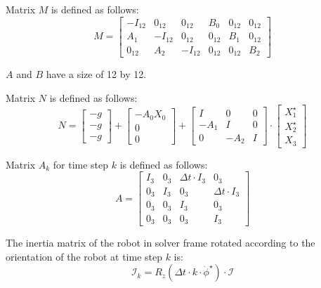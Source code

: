 \documentclass[a4paper,11pt]{article}
\begin{document}
Matrix $M$ is defined as follows:
\begin{equation}
M = \begin{bmatrix} 
-I_{12} & 0_{12} & 0_{12}  & B_0 & 0_{12} & 0_{12}  \\
A_1 & -I_{12} & 0_{12}  & 0_{12} & B_1 & 0_{12} \\
0_{12} & A_2 & -I_{12}  & 0_{12} & 0_{12} & B_2  \end{bmatrix}
\end{equation}

$A$ and $B$ have a size of 12 by 12.

Matrix $N$ is defined as follows:
\begin{equation}
N = \begin{bmatrix} -g \\ -g \\ -g \end{bmatrix} + \begin{bmatrix} -A_0 X_0 \\ 0 \\ 0  \end{bmatrix} + \begin{bmatrix} I & 0 & 0 \\ -A_1 & I & 0 \\ 0 & -A_2 & I \end{bmatrix} \cdot \begin{bmatrix} X_1^\star \\ X_2^\star \\ X_3 \end{bmatrix} 
\end{equation}

Matrix $A_k$ for time step $k$ is defined as follows:
\begin{equation}
A = \begin{bmatrix} 
I_3 & 0_3 & \Delta t \cdot I_3 & 0_3 \\
0_3 & I_3 & 0_3 & \Delta t \cdot I_3 \\
0_3 & 0_3 & I_3 & 0_3 \\
0_3 & 0_3 & 0_3 & I_3
\end{bmatrix}
\end{equation}


The inertia matrix of the robot in solver frame rotated according to the orientation of the robot at time step $k$ is:
\begin{equation}
\mathcal{I}_k = R_z(\Delta t \cdot k \cdot \dot \phi^\star) \cdot \mathcal{I}
\end{equation}
\end{document}
